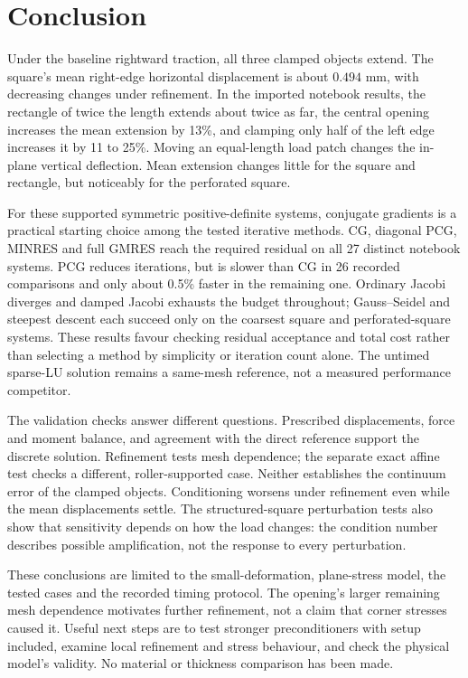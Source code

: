 \section{Conclusion}
\label{sec:conclusion}

Under the baseline rightward traction, all three clamped objects extend.
The square's mean right-edge horizontal displacement is about $0.494$ mm,
with decreasing changes under refinement. In the imported notebook results,
the rectangle of twice the length extends about twice as far, the central
opening increases the mean extension by 13\%, and clamping only half of
the left edge increases it by 11 to 25\%. Moving an equal-length load
patch changes the in-plane vertical deflection. Mean extension changes
little for the square and rectangle, but noticeably for the perforated
square.

For these supported symmetric positive-definite systems, conjugate
gradients is a practical starting choice among the tested iterative
methods. CG, diagonal PCG, MINRES and full GMRES reach the required
residual on all 27 distinct notebook systems. PCG reduces iterations,
but is slower than CG in 26 recorded comparisons and only about 0.5\%
faster in the remaining one. Ordinary Jacobi diverges and damped Jacobi
exhausts the budget throughout; Gauss--Seidel and steepest descent each
succeed only on the coarsest square and perforated-square systems.
These results favour checking residual acceptance and total cost rather
than selecting a method by simplicity or iteration count alone. The
untimed sparse-LU solution remains a same-mesh reference, not a measured
performance competitor.

The validation checks answer different questions. Prescribed displacements,
force and moment balance, and agreement with the direct reference support
the discrete solution. Refinement tests mesh dependence; the separate
exact affine test checks a different, roller-supported case. Neither
establishes the continuum error of the clamped objects. Conditioning
worsens under refinement even while the mean displacements settle.
The structured-square perturbation tests also show that sensitivity
depends on how the load changes: the condition number describes possible
amplification, not the response to every perturbation.

These conclusions are limited to the small-deformation, plane-stress
model, the tested cases and the recorded timing protocol. The opening's
larger remaining mesh dependence motivates further refinement, not a
claim that corner stresses caused it. Useful next steps are to test
stronger preconditioners with setup included, examine local refinement
and stress behaviour, and check the physical model's validity. No material
or thickness comparison has been made.
